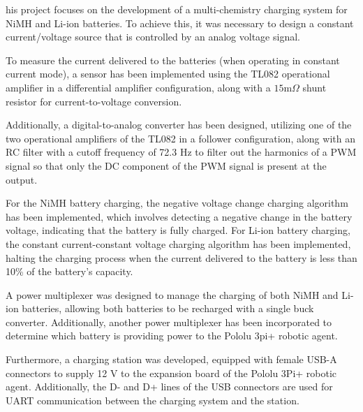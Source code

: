 his project focuses on the development of a multi-chemistry charging system 
for NiMH and Li-ion batteries. To achieve this, it was necessary to design a
 constant current/voltage source that is controlled by an analog voltage signal.

To measure the current delivered to the batteries (when operating in constant
current mode), a sensor has been implemented using the TL082 operational 
amplifier in a differential amplifier configuration, along with a 
$15 \text{m}\Omega$ shunt resistor for current-to-voltage conversion.

Additionally, a digital-to-analog converter has been designed, utilizing
one of the two operational amplifiers of the TL082 in a follower configuration,
along with an RC filter with a cutoff frequency of 72.3 Hz to filter out the 
harmonics of a PWM signal so that only the DC component of the PWM signal is 
present at the output.

For the NiMH battery charging, the negative voltage change charging algorithm 
has been implemented, which involves detecting a negative change in the battery
voltage, indicating that the battery is fully charged. For Li-ion battery 
charging, the constant current-constant voltage charging algorithm has been
implemented, halting the charging process when the current delivered to the 
battery is less than 10\% of the battery's capacity.

A power multiplexer was designed to manage the charging of both NiMH and
Li-ion batteries, allowing both batteries to be recharged with a single 
buck converter. Additionally, another power multiplexer has been incorporated 
to determine which battery is providing power to the Pololu 3pi+ robotic agent.

Furthermore, a charging station was developed, equipped with female USB-A 
connectors to supply 12 V to the expansion board of the Pololu 3Pi+ robotic 
agent. Additionally, the D- and D+ lines of the USB connectors are used for 
UART communication between the charging system and the station.